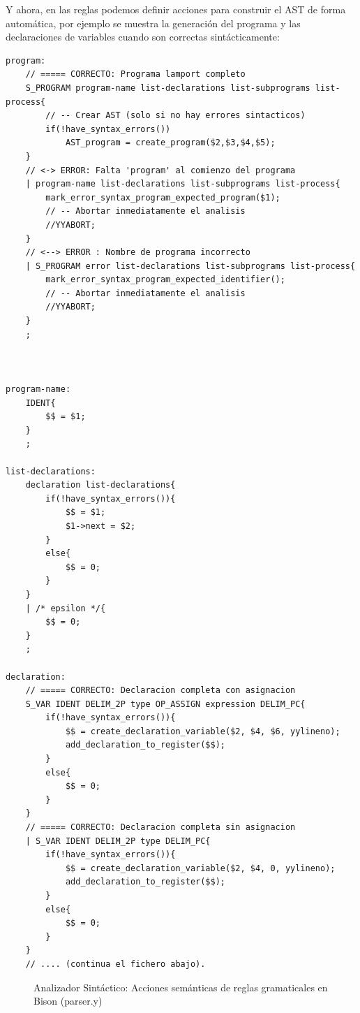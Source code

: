 \noindent
Y ahora, en las reglas podemos definir acciones para construir el AST de forma automática, por ejemplo se muestra la generación del programa y las declaraciones de variables cuando son correctas sintácticamente:

\begin{lstlisting}[style=customflex]
program:
    // ===== CORRECTO: Programa lamport completo
    S_PROGRAM program-name list-declarations list-subprograms list-process{
        // -- Crear AST (solo si no hay errores sintacticos)
        if(!have_syntax_errors())
            AST_program = create_program($2,$3,$4,$5);
    }
    // <-> ERROR: Falta 'program' al comienzo del programa
    | program-name list-declarations list-subprograms list-process{
        mark_error_syntax_program_expected_program($1);
        // -- Abortar inmediatamente el analisis
        //YYABORT;
    }
    // <--> ERROR : Nombre de programa incorrecto
    | S_PROGRAM error list-declarations list-subprograms list-process{
        mark_error_syntax_program_expected_identifier();
        // -- Abortar inmediatamente el analisis
        //YYABORT;
    }
    ;



program-name:
    IDENT{ 
        $$ = $1;
    }
    ;

list-declarations:
    declaration list-declarations{
        if(!have_syntax_errors()){
            $$ = $1;
            $1->next = $2;
        }
        else{
            $$ = 0;
        }
    }
    | /* epsilon */{
        $$ = 0;
    }
    ;

declaration:
    // ===== CORRECTO: Declaracion completa con asignacion
    S_VAR IDENT DELIM_2P type OP_ASSIGN expression DELIM_PC{
        if(!have_syntax_errors()){
            $$ = create_declaration_variable($2, $4, $6, yylineno);
            add_declaration_to_register($$);
        }
        else{
            $$ = 0;
        }
    }
    // ===== CORRECTO: Declaracion completa sin asignacion
    | S_VAR IDENT DELIM_2P type DELIM_PC{
        if(!have_syntax_errors()){
            $$ = create_declaration_variable($2, $4, 0, yylineno);
            add_declaration_to_register($$);
        }
        else{
            $$ = 0;
        }
    }
    // .... (continua el fichero abajo).
\end{lstlisting}
\begin{figure}[h]
\caption{Analizador Sintáctico: Acciones semánticas de reglas gramaticales en Bison (parser.y)}
\label{fig:bisonActionRules}
\end{figure}

